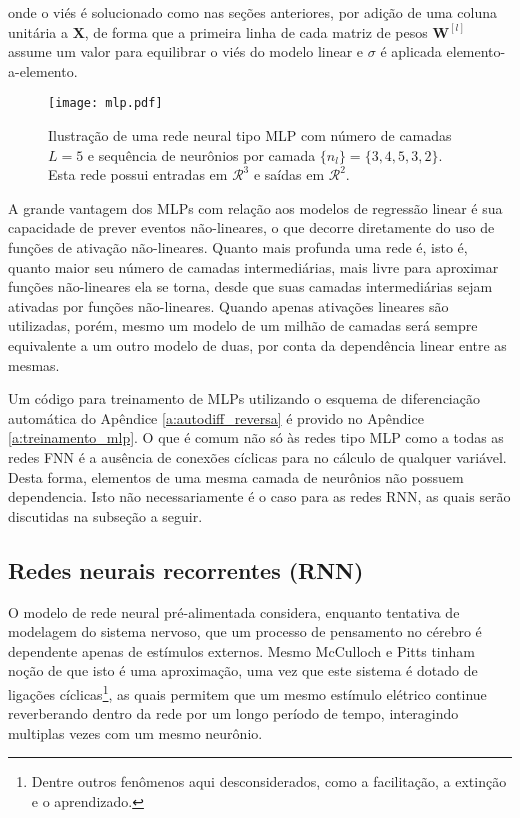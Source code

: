     \noindent onde o viés é solucionado como nas seções anteriores, por adição de uma coluna unitária a $\boldsymbol{X}$, de forma que a primeira linha de cada matriz de pesos $\boldsymbol{W}^{[l]}$ assume um valor para equilibrar o viés do modelo linear e $\sigma$ é aplicada elemento-a-elemento.

    \begin{figure}
      \begin{center}
        \texttt{[image: mlp.pdf]}
      \end{center}
      \caption{Ilustração de uma rede neural tipo MLP com número de camadas $L=5$ e sequência de neurônios por camada $\{n_l\} = \{3,4,5,3,2\}$. Esta rede possui entradas em $\mathcal{R}^{3}$ e saídas em $\mathcal{R}^{2}$.}
      \label{f:mlp}
    \end{figure}

    A grande vantagem dos MLPs com relação aos modelos de regressão linear é sua capacidade de prever eventos não-lineares, o que decorre diretamente do uso de funções de ativação não-lineares. Quanto mais profunda uma rede é, isto é, quanto maior seu número de camadas intermediárias, mais livre para aproximar funções não-lineares ela se torna, desde que suas camadas intermediárias sejam ativadas por funções não-lineares. Quando apenas ativações lineares são utilizadas, porém, mesmo um modelo de um milhão de camadas será sempre equivalente a um outro modelo de duas, por conta da dependência linear entre as mesmas.

    Um código para treinamento de MLPs utilizando o esquema de diferenciação automática do Apêndice \ref{a:autodiff_reversa} é provido no Apêndice \ref{a:treinamento_mlp}. O que é comum não só às redes tipo MLP como a todas as redes FNN é a ausência de conexões cíclicas para no cálculo de qualquer variável. Desta forma, elementos de uma mesma camada de neurônios não possuem dependencia. Isto não necessariamente é o caso para as redes RNN, as quais serão discutidas na subseção a seguir.

    \subsection{Redes neurais recorrentes (RNN)} \label{s:rnn}

      O modelo de rede neural pré-alimentada considera, enquanto tentativa de modelagem do sistema nervoso, que um processo de pensamento no cérebro é dependente apenas de estímulos externos. Mesmo McCulloch e Pitts \citeyear{mcculloch1943logical} tinham noção de que isto é uma aproximação, uma vez que este sistema é dotado de ligações cíclicas\footnote{Dentre outros fenômenos aqui desconsiderados, como a facilitação, a extinção e o aprendizado.}, as quais permitem que um mesmo estímulo elétrico continue reverberando dentro da rede por um longo período de tempo, interagindo multiplas vezes com um mesmo neurônio.

